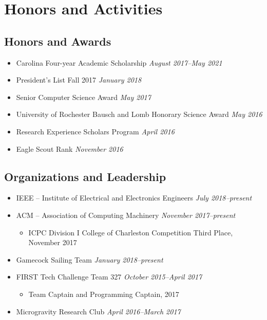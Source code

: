 \documentclass[10pt,letterpaper]{moderncv}
\begin{document}
\section{Honors and Activities}
\subsection{\textbf{Honors and Awards}}
\begin{itemize}
  \item Carolina Four-year Academic Scholarship \hfill \textit{August 2017--May 2021}
  \item President's List Fall 2017 \hfill \textit{January 2018}

  \item Senior Computer Science Award \hfill \textit{May 2017}
  \item University of Rochester Bausch and Lomb Honorary Science Award \hfill \textit{May 2016}
  \item Research Experience Scholars Program \hfill \textit{April 2016}
  \item Eagle Scout Rank \hfill \textit{November 2016}
\end{itemize}

\subsection{\textbf{Organizations and Leadership}}
\begin{itemize}
  \item IEEE -- Institute of Electrical and Electronics Engineers \hfill \textit{July 2018--present}
  \item ACM -- Association of Computing Machinery \hfill \textit{November 2017--present}
  \begin{itemize}
    \item ICPC Division I College of Charleston Competition Third Place, November 2017
  \end{itemize}
  \item Gamecock Sailing Team \hfill \textit{January 2018--present}

  \item FIRST Tech Challenge Team 327 \hfill \textit{October 2015--April 2017}
  \begin{itemize}
    \item Team Captain and Programming Captain, 2017
  \end{itemize}
  \item Microgravity Research Club \hfill \textit{April 2016--March 2017}
\end{itemize}
\end{document}

